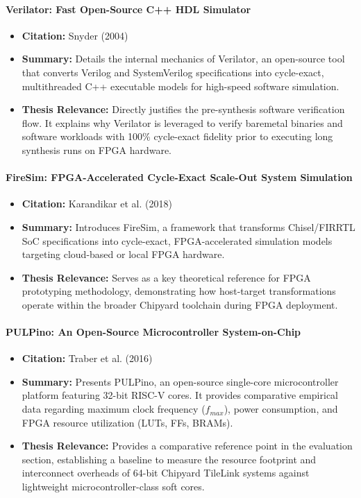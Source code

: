 \documentclass[12pt,a4paper]{article}
\begin{document}
\paragraph{Verilator: Fast Open-Source C++ HDL Simulator}
\begin{itemize}
    \item \textbf{Citation:} Snyder (2004) \cite{snyder2004verilator}
    \item \textbf{Summary:} Details the internal mechanics of Verilator, an open-source tool that converts Verilog and SystemVerilog specifications into cycle-exact, multithreaded C++ executable models for high-speed software simulation.
    \item \textbf{Thesis Relevance:} Directly justifies the pre-synthesis software verification flow. It explains why Verilator is leveraged to verify baremetal binaries and software workloads with 100\% cycle-exact fidelity prior to executing long synthesis runs on FPGA hardware.
\end{itemize}

\paragraph{FireSim: FPGA-Accelerated Cycle-Exact Scale-Out System Simulation}
\begin{itemize}
    \item \textbf{Citation:} Karandikar et al. (2018) \cite{karandikar2018firesim}
    \item \textbf{Summary:} Introduces FireSim, a framework that transforms Chisel/FIRRTL SoC specifications into cycle-exact, FPGA-accelerated simulation models targeting cloud-based or local FPGA hardware.
    \item \textbf{Thesis Relevance:} Serves as a key theoretical reference for FPGA prototyping methodology, demonstrating how host-target transformations operate within the broader Chipyard toolchain during FPGA deployment.
\end{itemize}

\paragraph{PULPino: An Open-Source Microcontroller System-on-Chip}
\begin{itemize}
    \item \textbf{Citation:} Traber et al. (2016) \cite{traber2016pulpino}
    \item \textbf{Summary:} Presents PULPino, an open-source single-core microcontroller platform featuring 32-bit RISC-V cores. It provides comparative empirical data regarding maximum clock frequency ($f_{max}$), power consumption, and FPGA resource utilization (LUTs, FFs, BRAMs).
    \item \textbf{Thesis Relevance:} Provides a comparative reference point in the evaluation section, establishing a baseline to measure the resource footprint and interconnect overheads of 64-bit Chipyard TileLink systems against lightweight microcontroller-class soft cores.
\end{itemize}
\end{document}
